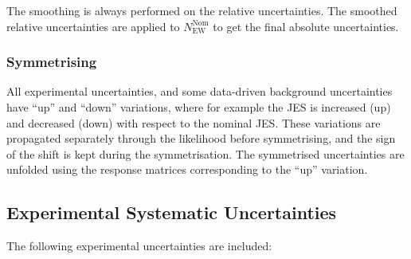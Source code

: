 The smoothing is always performed on the relative uncertainties. The smoothed relative uncertainties are applied to $N_{\text{EW}}^{\text{Nom}}$ to get the final absolute uncertainties.

\subsubsection{Symmetrising}

 All experimental uncertainties, and some data-driven background uncertainties have ``up'' and ``down'' variations, where for example the JES is increased (up) and decreased (down) with respect to the nominal JES. These variations are propagated separately through the likelihood before symmetrising, and the sign of the shift is kept during the symmetrisation. The symmetrised uncertainties are unfolded using the response matrices corresponding to the ``up'' variation.

\subsection{Experimental Systematic Uncertainties}\label{sec:expsysts_extraction}

The following experimental uncertainties are included:

